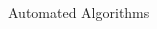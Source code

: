 \documentclass{beamer}
\begin{document}
\begin{frame}{Automated Algorithms}
\begin{columns}
\begin{column}[T]{0.5\textwidth}
\begin{figure}
\begin{subfigure}{\textwidth}
				\end{subfigure}
			\end{figure}
		\end{column}
	\end{columns}
\end{frame}

% 
% 
\end{document}
